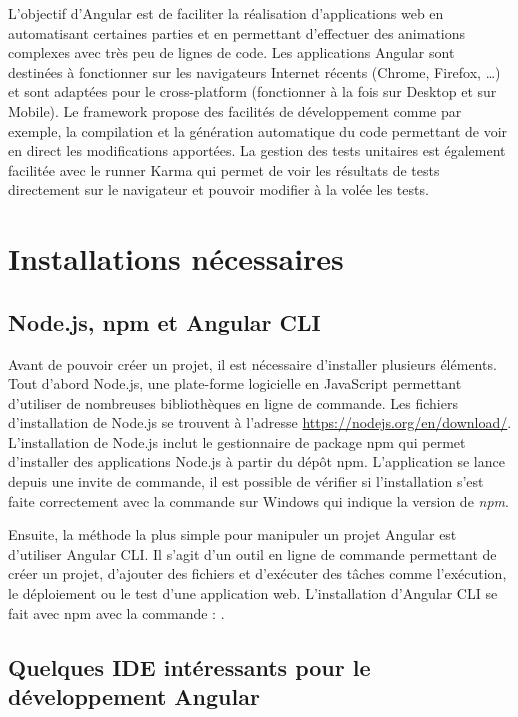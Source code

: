\documentclass{polytech/polytech}
\begin{document}
L’objectif d’Angular est de faciliter la réalisation d’applications web en automatisant certaines parties et en permettant d’effectuer des animations complexes avec très peu de lignes de code. Les applications Angular sont destinées à fonctionner sur les navigateurs Internet récents (Chrome, Firefox, …) et sont adaptées pour le cross-platform (fonctionner à la fois sur Desktop et sur Mobile). Le framework propose des facilités de développement comme par exemple, la compilation et la génération automatique du code permettant de voir en direct les modifications apportées. La gestion des tests unitaires est également facilitée avec le runner Karma qui permet de voir les résultats de tests directement sur le navigateur et pouvoir modifier à la volée les tests.

\section{Installations nécessaires}

\subsection{Node.js, npm et Angular CLI}

Avant de pouvoir créer un projet, il est nécessaire d’installer plusieurs éléments. Tout d’abord Node.js, une plate-forme logicielle en JavaScript permettant d’utiliser de nombreuses bibliothèques en ligne de commande. Les fichiers d’installation de Node.js se trouvent à l’adresse \url{https://nodejs.org/en/download/}. L’installation de Node.js inclut le gestionnaire de package npm qui permet d’installer des applications Node.js à partir du dépôt npm. L’application se lance depuis une invite de commande, il est possible de vérifier si l’installation s’est faite correctement avec la commande  sur Windows qui indique la version de \textit{npm}. 

Ensuite, la méthode la plus simple pour manipuler un projet Angular est d’utiliser Angular CLI. Il s’agit d’un outil en ligne de commande permettant de créer un projet, d’ajouter des fichiers et d’exécuter des tâches comme l’exécution, le déploiement ou le test d’une application web. L’installation d’Angular CLI se fait avec npm avec la commande : .

\subsection{Quelques IDE intéressants pour le développement Angular}
\end{document}
